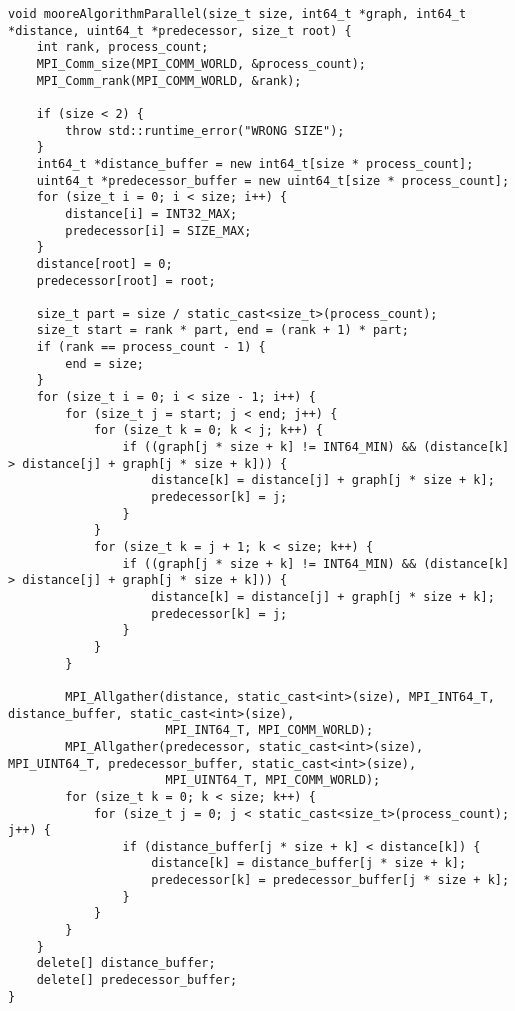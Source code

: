 \documentclass{report}
\begin{document}
\begin{lstlisting}
void mooreAlgorithmParallel(size_t size, int64_t *graph, int64_t *distance, uint64_t *predecessor, size_t root) {
    int rank, process_count;
    MPI_Comm_size(MPI_COMM_WORLD, &process_count);
    MPI_Comm_rank(MPI_COMM_WORLD, &rank);

    if (size < 2) {
        throw std::runtime_error("WRONG SIZE");
    }
    int64_t *distance_buffer = new int64_t[size * process_count];
    uint64_t *predecessor_buffer = new uint64_t[size * process_count];
    for (size_t i = 0; i < size; i++) {
        distance[i] = INT32_MAX;
        predecessor[i] = SIZE_MAX;
    }
    distance[root] = 0;
    predecessor[root] = root;

    size_t part = size / static_cast<size_t>(process_count);
    size_t start = rank * part, end = (rank + 1) * part;
    if (rank == process_count - 1) {
        end = size;
    }
    for (size_t i = 0; i < size - 1; i++) {
        for (size_t j = start; j < end; j++) {
            for (size_t k = 0; k < j; k++) {
                if ((graph[j * size + k] != INT64_MIN) && (distance[k] > distance[j] + graph[j * size + k])) {
                    distance[k] = distance[j] + graph[j * size + k];
                    predecessor[k] = j;
                }
            }
            for (size_t k = j + 1; k < size; k++) {
                if ((graph[j * size + k] != INT64_MIN) && (distance[k] > distance[j] + graph[j * size + k])) {
                    distance[k] = distance[j] + graph[j * size + k];
                    predecessor[k] = j;
                }
            }
        }

        MPI_Allgather(distance, static_cast<int>(size), MPI_INT64_T, distance_buffer, static_cast<int>(size),
                      MPI_INT64_T, MPI_COMM_WORLD);
        MPI_Allgather(predecessor, static_cast<int>(size), MPI_UINT64_T, predecessor_buffer, static_cast<int>(size),
                      MPI_UINT64_T, MPI_COMM_WORLD);
        for (size_t k = 0; k < size; k++) {
            for (size_t j = 0; j < static_cast<size_t>(process_count); j++) {
                if (distance_buffer[j * size + k] < distance[k]) {
                    distance[k] = distance_buffer[j * size + k];
                    predecessor[k] = predecessor_buffer[j * size + k];
                }
            }
        }
    }
    delete[] distance_buffer;
    delete[] predecessor_buffer;
}

\end{lstlisting}
\end{document}
